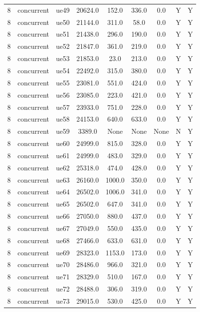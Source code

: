 \begin{table}[ht]
\begin{tabular}{|c|c|c|c|c|c|c|c|c|}
8 & concurrent & ue49 & 20624.0 & 152.0 & 336.0 & 0.0 & Y & Y \\
8 & concurrent & ue50 & 21144.0 & 311.0 & 58.0 & 0.0 & Y & Y \\
8 & concurrent & ue51 & 21438.0 & 296.0 & 190.0 & 0.0 & Y & Y \\
8 & concurrent & ue52 & 21847.0 & 361.0 & 219.0 & 0.0 & Y & Y \\
8 & concurrent & ue53 & 21853.0 & 23.0 & 213.0 & 0.0 & Y & Y \\
8 & concurrent & ue54 & 22492.0 & 315.0 & 380.0 & 0.0 & Y & Y \\
8 & concurrent & ue55 & 23081.0 & 551.0 & 424.0 & 0.0 & Y & Y \\
8 & concurrent & ue56 & 23085.0 & 223.0 & 421.0 & 0.0 & Y & Y \\
8 & concurrent & ue57 & 23933.0 & 751.0 & 228.0 & 0.0 & Y & Y \\
8 & concurrent & ue58 & 24153.0 & 640.0 & 633.0 & 0.0 & Y & Y \\
8 & concurrent & ue59 & 3389.0 & None & None & None & N & Y \\
8 & concurrent & ue60 & 24999.0 & 815.0 & 328.0 & 0.0 & Y & Y \\
8 & concurrent & ue61 & 24999.0 & 483.0 & 329.0 & 0.0 & Y & Y \\
8 & concurrent & ue62 & 25318.0 & 474.0 & 428.0 & 0.0 & Y & Y \\
8 & concurrent & ue63 & 26160.0 & 1000.0 & 350.0 & 0.0 & Y & Y \\
8 & concurrent & ue64 & 26502.0 & 1006.0 & 341.0 & 0.0 & Y & Y \\
8 & concurrent & ue65 & 26502.0 & 647.0 & 341.0 & 0.0 & Y & Y \\
8 & concurrent & ue66 & 27050.0 & 880.0 & 437.0 & 0.0 & Y & Y \\
8 & concurrent & ue67 & 27049.0 & 550.0 & 435.0 & 0.0 & Y & Y \\
8 & concurrent & ue68 & 27466.0 & 633.0 & 631.0 & 0.0 & Y & Y \\
8 & concurrent & ue69 & 28323.0 & 1153.0 & 173.0 & 0.0 & Y & Y \\
8 & concurrent & ue70 & 28486.0 & 966.0 & 321.0 & 0.0 & Y & Y \\
8 & concurrent & ue71 & 28329.0 & 510.0 & 167.0 & 0.0 & Y & Y \\
8 & concurrent & ue72 & 28488.0 & 306.0 & 319.0 & 0.0 & Y & Y \\
8 & concurrent & ue73 & 29015.0 & 530.0 & 425.0 & 0.0 & Y & Y \\

\end{tabular}
\end{table}
